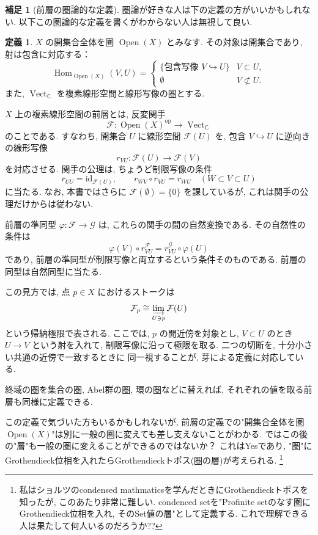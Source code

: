 \documentclass[dvipdfmx,a4paper,11pt]{article} %
\newcommand{\C}{\mathbb{C}}
\theoremstyle{definition}
\numberwithin{equation}{section}
\newtheorem{defn}[thm]{定義}
\newtheorem{rem}[thm]{補足}
\begin{document}
\begin{rem}[前層の圏論的な定義]
圏論が好きな人は下の定義の方がいいかもしれない. 以下この圏論的な定義を書くがわからない人は無視して良い. 

\begin{defn}
$X$ の開集合全体を圏 $\operatorname{Open}(X)$ とみなす.
その対象は開集合であり, 射は包含に対応する：
\[
\operatorname{Hom}_{\operatorname{Open}(X)}(V,U)
=
\begin{cases}
\{\text{包含写像 }V\hookrightarrow U\} & V\subset U,\\
\emptyset & V\not\subset U.
\end{cases}
\]
また, $\operatorname{Vect}_{\C}$ を複素線形空間と線形写像の圏とする.

$X$ 上の複素線形空間の前層とは, 反変関手
\[
\mathcal F:\operatorname{Open}(X)^{\mathrm{op}}
\longrightarrow\operatorname{Vect}_{\C}
\]
のことである.
すなわち, 開集合 $U$ に線形空間 $\mathcal F(U)$ を, 
包含 $V\hookrightarrow U$ に逆向きの線形写像
\[
r_{VU}:\mathcal F(U)\longrightarrow\mathcal F(V)
\]
を対応させる.
関手の公理は, ちょうど制限写像の条件
\[
r_{UU}=\mathrm{id}_{\mathcal F(U)},\qquad
r_{WV}\circ r_{VU}=r_{WU}\quad(W\subset V\subset U)
\]
に当たる.
なお, 本書ではさらに $\mathcal F(\emptyset)=\{0\}$ を課しているが, 
これは関手の公理だけからは従わない.

前層の準同型 $\varphi:\mathcal F\to\mathcal G$ は, 
これらの関手の間の自然変換である.
その自然性の条件は
\[
\varphi(V)\circ r^{\mathcal F}_{VU}
=
r^{\mathcal G}_{VU}\circ\varphi(U)
\]
であり, 前層の準同型が制限写像と両立するという条件そのものである.
前層の同型は自然同型に当たる.

この見方では, 点 $p\in X$ におけるストークは
\[
\mathcal F_p
\cong
\varinjlim_{U\ni p}\mathcal F(U)
\]
という帰納極限で表される.
ここでは, $p$ の開近傍を対象とし, 
$V\subset U$ のとき $U\to V$ という射を入れて, 
制限写像に沿って極限を取る.
二つの切断を, 十分小さい共通の近傍で一致するときに
同一視することが, 芽による定義に対応している.
\end{defn}
終域の圏を集合の圏, Abel群の圏, 環の圏などに替えれば, 
それぞれの値を取る前層も同様に定義できる.

この定義で気づいた方もいるかもしれないが, 前層の定義での"開集合全体を圏 $\operatorname{Open}(X)$"は別に一般の圏に変えても差し支えないことがわかる. 
ではこの後の"層"も一般の圏に変えることができるのではないか？
これはYesであり, "圏"にGrothendieck位相を入れたらGrothendieckトポス(圏の層)が考えられる. 
\footnote{私はショルツのcondensed mathmaticsを学んだときにGrothendieckトポスを知ったが, このあたり非常に難しい. condenced setを"Profinite setのなす圏にGrothendieck位相を入れ, そのSet値の層"として定義する. これで理解できる人は果たして何人いるのだろうか??}
\end{rem}
\end{document}
